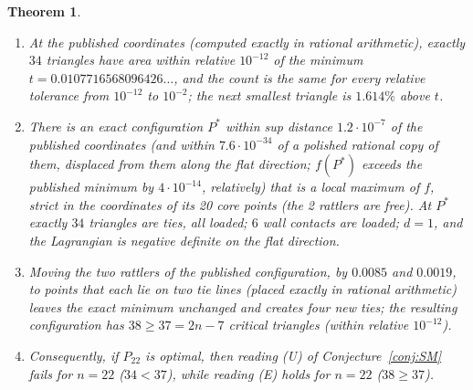 \documentclass[11pt]{amsart}
\newtheorem{theorem}{Theorem}
\theoremstyle{definition}
\begin{document}
\begin{theorem}\label{thm:22}
\begin{enumerate}[label=(\alph*)]
\item At the published coordinates (computed exactly in rational arithmetic), exactly $34$ triangles have area within relative $10^{-12}$ of the minimum $t = 0.0107716568096426\ldots$, and the count is the same for every relative tolerance from $10^{-12}$ to $10^{-2}$; the next smallest triangle is $1.614\%$ above $t$.
\item There is an exact configuration $P^*$ within sup distance $1.2\cdot10^{-7}$ of the published coordinates (and within $7.6\cdot10^{-34}$ of a polished rational copy of them, displaced from them along the flat direction; $f(P^*)$ exceeds the published minimum by $4\cdot10^{-14}$, relatively) that is a local maximum of $f$, strict in the coordinates of its 20 core points (the 2 rattlers are free). At $P^*$ exactly $34$ triangles are ties, all loaded; $6$ wall contacts are loaded; $d = 1$, and the Lagrangian is negative definite on the flat direction.
\item Moving the two rattlers of the published configuration, by $0.0085$ and $0.0019$, to points that each lie on two tie lines (placed exactly in rational arithmetic) leaves the exact minimum unchanged and creates four new ties; the resulting configuration has $38 \ge 37 = 2n-7$ critical triangles (within relative $10^{-12}$).
\item Consequently, if $P_{22}$ is optimal, then reading (U) of Conjecture~\ref{conj:SM} fails for $n = 22$ ($34 < 37$), while reading (E) holds for $n = 22$ ($38 \ge 37$).
\end{enumerate}
\end{theorem}
\end{document}
